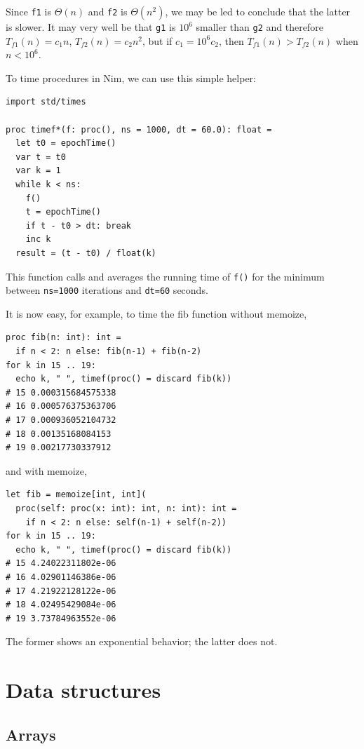 \documentclass[justified, sixbynine]{tufte-book}
\def\ft{\small\tt}
\theoremstyle{plain}%
\newtheorem * {corollary}{Corollary}
\theoremstyle{definition}
\theoremstyle{remark}
\newtheorem * {remark}{Remark}
\newtheorem * {note}{Note}
\begin{document}
\begin{fullwidth}
Since {\ft f1} is $\Theta(n)$ and {\ft f2} is $\Theta(n^2)$, we may be led to conclude that the latter is slower. It may very well be that {\ft g1} is $10^6$ smaller than {\ft g2} and therefore $T_{f1}(n) = c_1 n$, $T_{f2}(n) = c_2 n^2$, but if $c_1 = 10^6 c_2$, then $T_{f1}(n) > T_{f2}(n)$ when $n<10^6$.

To time procedures in Nim, we can use this simple helper:

\begin{lstlisting}[caption={in file: {\ft nlib/timer.nim}}]
import std/times

proc timef*(f: proc(), ns = 1000, dt = 60.0): float =
  let t0 = epochTime()
  var t = t0
  var k = 1
  while k < ns:
    f()
    t = epochTime()
    if t - t0 > dt: break
    inc k
  result = (t - t0) / float(k)
\end{lstlisting}

This function calls and averages the running time of {\ft f()} for the minimum between {\ft ns=1000} iterations and {\ft dt=60} seconds.

It is now easy, for example, to time the fib function without memoize,
\begin{lstlisting}
proc fib(n: int): int =
  if n < 2: n else: fib(n-1) + fib(n-2)
for k in 15 .. 19:
  echo k, " ", timef(proc() = discard fib(k))
# 15 0.000315684575338
# 16 0.000576375363706
# 17 0.000936052104732
# 18 0.00135168084153
# 19 0.00217730337912
\end{lstlisting}
and with memoize,
\begin{lstlisting}
let fib = memoize[int, int](
  proc(self: proc(x: int): int, n: int): int =
    if n < 2: n else: self(n-1) + self(n-2))
for k in 15 .. 19:
  echo k, " ", timef(proc() = discard fib(k))
# 15 4.24022311802e-06
# 16 4.02901146386e-06
# 17 4.21922128122e-06
# 18 4.02495429084e-06
# 19 3.73784963552e-06
\end{lstlisting}

The former shows an exponential behavior; the latter does not.

\goodbreak\section{Data structures}

\goodbreak\subsection{Arrays}


\end{fullwidth}
\end{document}
